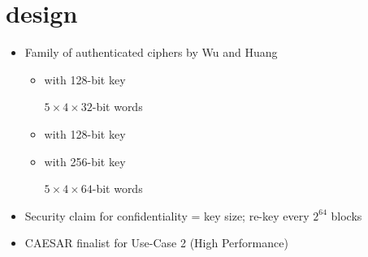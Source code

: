 \documentclass[aspectratio=169,10pt,webfont]{beamer}
\begin{document}
\section{\emph{\itemwrap{\faCogs}} \MORUS design}


\begin{frame}{\MORUS}

  \begin{itemize}
    \item Family of authenticated ciphers by Wu and Huang %
      \begin{itemize}
        \item \MORUS[640] with 128-bit key

          \hfill
          $5 \times 4 \times 32$-bit words
        \item \MORUS[1280-128] with 128-bit key
        \item \MORUS[1280-256] with 256-bit key

          \hfill
          $5 \times 4 \times 64$-bit words
      \end{itemize}
    \item Security claim for confidentiality = key size; re-key every $2^{64}$ blocks
    \item CAESAR finalist for Use-Case 2 (High Performance)
  \end{itemize}

\end{frame}
\end{document}

